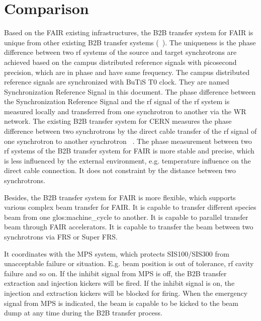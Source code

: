\section{Comparison}

Based on the FAIR existing infrastructures, the B2B transfer system for FAIR is unique from other existing B2B transfer systems (~\cite{ferrand_synchronization_2015, ezura_beam-dynamics_2008}). The uniqueness is the phase difference between two rf systems of the source and target synchrotrons are achieved based on the campus distributed reference signals with picosecond precision, which are in phase and have same frequency. The campus distributed reference signals are synchronized with BuTiS T0 clock. They are named Synchronization Reference Signal in this document. The phase difference between the Synchronization Reference Signal and the rf signal of the rf system is measured locally and transferred from one synchrotron to another via the WR network. The existing B2B transfer system for CERN measures the phase difference between two synchrotrons by the direct cable transfer of the rf signal of one synchrotron to another synchrotron ~\cite{ferrand_synchronization_2015}. The phase measurement between two rf systems of the B2B transfer system for FAIR is more stable and precise, which is less influenced by the external environment, e.g. temperature influence on the direct cable connection. It does not constraint by the distance between two synchrotrons.

Besides, the B2B transfer system for FAIR is more flexible, which supports various complex beam transfer for FAIR.  It is capable to transfer different species beam from one \gls{glos:machine_cycle} to another.  It is capable to parallel transfer beam through FAIR accelerators. It is capable to transfer the beam between two synchrotrons via FRS or Super FRS. 

It coordinates with the MPS system, which protects SIS100/SIS300 from unacceptable failure or situation. E.g. beam position is out of tolerance, rf cavity failure and so on. If the inhibit signal from MPS is off, the B2B transfer extraction and injection kickers will be fired. If the inhibit signal is on, the injection and extraction kickers will be blocked for firing.  When the emergency signal from MPS is indicated, the beam is capable to be kicked to the beam dump at any time during the B2B transfer process.



